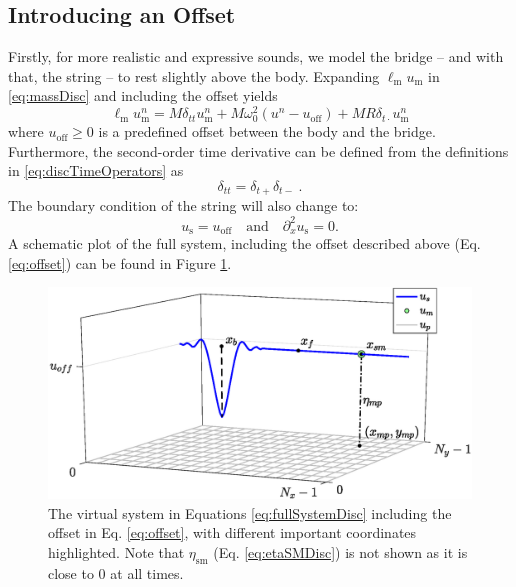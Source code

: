 \documentclass[dvipsnames, pdftex]{article}
\begin{document}
\subsection{Introducing an Offset}
Firstly, for more realistic and expressive sounds, we model the bridge -- and with that, the string -- to rest slightly above the body. Expanding $\ell_\text{m}u_\text{m}$ in \eqref{eq:massDisc} and including the offset yields
\begin{equation}\label{eq:offset}
    \ell_\text{m}u_\text{m}^n = M\delta_{tt}u_\text{m}^n+M\omega_0^2(u^n-u_\text{off})+MR\delta_{t\cdot}u_\text{m}^n
\end{equation}
where $u_\text{off} \geq 0$ is a predefined offset between the body and the bridge. Furthermore, the second-order time derivative can be defined from the definitions in \eqref{eq:discTimeOperators} as
\begin{equation}
    \delta_{tt} = \delta_{t+}\delta_{t-}\ .
\end{equation}
The boundary condition of the string will also change to:
\begin{equation}
    u_\text{s} = u_\text{off}\quad \text{and} \quad \partial_x^2u_\text{s}=0.
\end{equation}
A schematic plot of the full system, including the offset described above (Eq. \eqref{eq:offset}) can be found in Figure \ref{fig:trombaSystem}.
\begin{figure}[h]
  \centering
  \includegraphics[width=1.0\columnwidth]{trombaSystem.eps}
  \caption{The virtual system in Equations \eqref{eq:fullSystemDisc} including the offset in Eq. \eqref{eq:offset}, with different important coordinates highlighted. Note that $\eta_\text{sm}$ (Eq. \eqref{eq:etaSMDisc}) is not shown as it is close to 0 at all times. }
  \label{fig:trombaSystem}
\end{figure}
\end{document}
